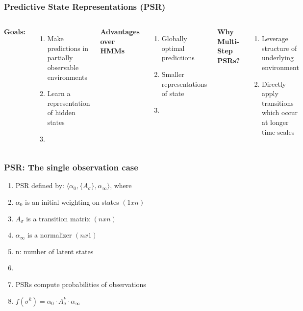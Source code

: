 \documentclass{beamer}
\begin{document}
\begin{frame}
\frametitle{Predictive State Representations (PSR)}
\begin{columns}[c] %

\textbf{Goals:}
\begin{enumerate}
\item Make predictions in partially observable environments 
\item Learn a representation of hidden states
\item[]
\end{enumerate}

\textbf{Advantages over HMMs}
\begin{enumerate}
\item Globally optimal predictions
\item Smaller representations of state
\item[]

\end{enumerate}

\textbf{Why Multi-Step PSRs?}
\begin{enumerate}
\item Leverage structure of underlying environment
\item Directly apply transitions which occur at longer time-scales 

\end{enumerate}

\end{columns}
\end{frame}


\begin{frame}
\frametitle{PSR: The single observation case}

\begin{enumerate}
\item PSR defined by: $\langle \alpha_0, \{A_\sigma\},\alpha_\infty \rangle$, where
\item[] $\alpha_0$ is an initial weighting on states $(1xn)$
\item[] $A_\sigma$ is a transition matrix $(nxn)$
\item[] $\alpha_\infty$ is a normalizer $(nx1)$
\item[] n: number of latent states
\item[]
\item PSRs compute probabilities of observations

\item[] $f(\sigma^k) = \alpha_0 \cdot A_\sigma^k \cdot \alpha_\infty$

\end{enumerate}

\end{frame}
\end{document}

